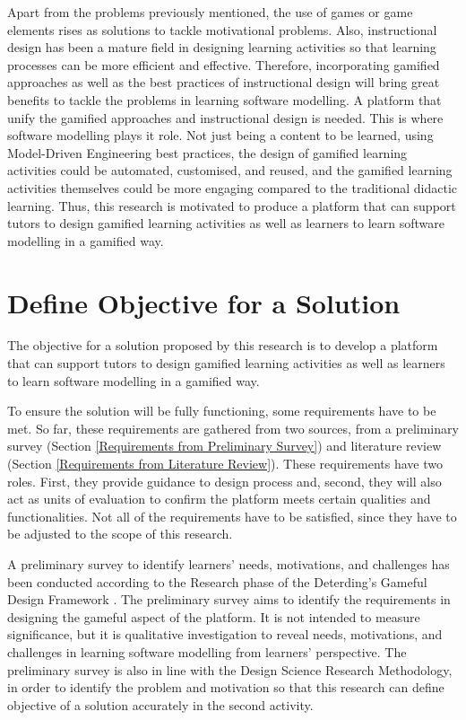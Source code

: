\documentclass[12pt, a4paper]{report} \usepackage[titletoc]{appendix}
\begin{document}
Apart from the problems previously mentioned, the use of games or game elements rises as solutions to tackle motivational problems. Also, instructional design has been a mature field in designing learning activities so that learning processes can be more efficient and effective. Therefore, incorporating gamified approaches as well as the best practices of instructional design will bring great benefits to tackle the problems in learning software modelling. A platform that unify the gamified approaches and instructional design is needed. This is where software modelling plays it role. Not just being a content to be learned, using Model-Driven Engineering best practices, the design of gamified learning activities could be automated, customised, and reused, and the gamified learning activities themselves could be more engaging compared to the traditional didactic learning. Thus, this research is motivated to produce a platform that can support tutors to design gamified learning activities as well as learners to learn software modelling in a gamified way.


\section{Define Objective for a Solution}
The objective for a solution proposed by this research is to develop a platform that can support tutors to design gamified learning activities as well as learners to learn software modelling in a gamified way. 

To ensure the solution will be fully functioning, some requirements have to be met. So far, these requirements are gathered from two sources, from a preliminary survey (Section \ref{Requirements from Preliminary Survey}) and literature review (Section \ref{Requirements from Literature Review}). These requirements have two roles. First, they provide guidance to design process and, second, they will also act as units of evaluation to confirm the platform meets certain qualities and functionalities. Not all of the requirements have to be satisfied, since they have to be adjusted to the scope of this research. 

A preliminary survey to identify learners' needs, motivations, and challenges has been conducted according to the Research phase of the Deterding's Gameful Design Framework \cite{deterding2015lens}. The preliminary survey aims to identify the requirements in designing the gameful aspect of the platform. It is not intended to measure significance, but it is qualitative investigation to reveal needs, motivations, and challenges in learning software modelling from learners' perspective. The preliminary survey is also in line with the Design Science Research Methodology, in order to identify the problem and motivation so that this research can define objective of a solution accurately in the second activity.
\end{document}
